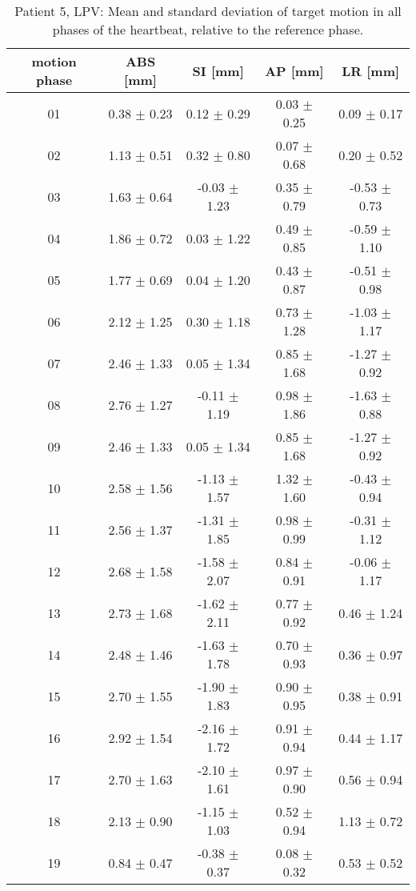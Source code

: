 \newpage

\begin{table}[htbp]
  \centering
    \tiny
  \caption{Patient 5, LPV: Mean and standard deviation of target motion in all phases of the heartbeat, relative to the reference phase.}
  \begin{tabular}{|c|c|c|c|c|}
    \hline\hline
    motion phase\rule{0pt}{2.6ex}\rule[-1.2ex]{0pt}{0pt} & ABS [mm] & SI [mm] & AP [mm] & LR [mm]\\
    \hline
01& 0.38 $\pm$ 0.23& 0.12 $\pm$ 0.29& 0.03 $\pm$ 0.25& 0.09 $\pm$ 0.17 \\
02& 1.13 $\pm$ 0.51& 0.32 $\pm$ 0.80& 0.07 $\pm$ 0.68& 0.20 $\pm$ 0.52 \\
03& 1.63 $\pm$ 0.64& -0.03 $\pm$ 1.23& 0.35 $\pm$ 0.79& -0.53 $\pm$ 0.73 \\
04& 1.86 $\pm$ 0.72& 0.03 $\pm$ 1.22& 0.49 $\pm$ 0.85& -0.59 $\pm$ 1.10 \\
05& 1.77 $\pm$ 0.69& 0.04 $\pm$ 1.20& 0.43 $\pm$ 0.87& -0.51 $\pm$ 0.98 \\
06& 2.12 $\pm$ 1.25& 0.30 $\pm$ 1.18& 0.73 $\pm$ 1.28& -1.03 $\pm$ 1.17 \\
07& 2.46 $\pm$ 1.33& 0.05 $\pm$ 1.34& 0.85 $\pm$ 1.68& -1.27 $\pm$ 0.92 \\
08& 2.76 $\pm$ 1.27& -0.11 $\pm$ 1.19& 0.98 $\pm$ 1.86& -1.63 $\pm$ 0.88 \\
09& 2.46 $\pm$ 1.33& 0.05 $\pm$ 1.34& 0.85 $\pm$ 1.68& -1.27 $\pm$ 0.92 \\
10& 2.58 $\pm$ 1.56& -1.13 $\pm$ 1.57& 1.32 $\pm$ 1.60& -0.43 $\pm$ 0.94 \\
11& 2.56 $\pm$ 1.37& -1.31 $\pm$ 1.85& 0.98 $\pm$ 0.99& -0.31 $\pm$ 1.12 \\
12& 2.68 $\pm$ 1.58& -1.58 $\pm$ 2.07& 0.84 $\pm$ 0.91& -0.06 $\pm$ 1.17 \\
13& 2.73 $\pm$ 1.68& -1.62 $\pm$ 2.11& 0.77 $\pm$ 0.92& 0.46 $\pm$ 1.24 \\ 
14& 2.48 $\pm$ 1.46& -1.63 $\pm$ 1.78& 0.70 $\pm$ 0.93& 0.36 $\pm$ 0.97 \\
15& 2.70 $\pm$ 1.55& -1.90 $\pm$ 1.83& 0.90 $\pm$ 0.95& 0.38 $\pm$ 0.91 \\
16& 2.92 $\pm$ 1.54& -2.16 $\pm$ 1.72& 0.91 $\pm$ 0.94& 0.44 $\pm$ 1.17 \\
17& 2.70 $\pm$ 1.63& -2.10 $\pm$ 1.61& 0.97 $\pm$ 0.90& 0.56 $\pm$ 0.94 \\
18& 2.13 $\pm$ 0.90& -1.15 $\pm$ 1.03& 0.52 $\pm$ 0.94& 1.13 $\pm$ 0.72 \\
19& 0.84 $\pm$ 0.47& -0.38 $\pm$ 0.37& 0.08 $\pm$ 0.32& 0.53 $\pm$ 0.52 \\
    \hline\hline
  \end{tabular}
\end{table}


